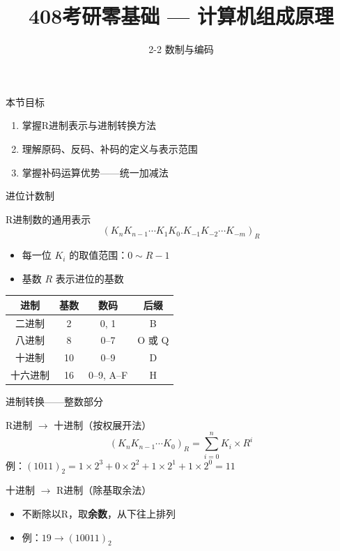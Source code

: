 \documentclass[10pt, aspectratio=169]{beamer}
\title{408考研零基础 --- 计算机组成原理}
\subtitle{2-2 数制与编码}
\author{}
\date{}
\begin{document}
\begin{frame}{本节目标}
    \begin{enumerate}
        \item 掌握R进制表示与进制转换方法
        \item 理解原码、反码、补码的定义与表示范围
        \item 掌握补码运算优势——统一加减法
    \end{enumerate}
\end{frame}

\begin{frame}{进位计数制}
    \begin{block}{R进制数的通用表示}
        \[
            (K_n K_{n-1} \cdots K_1 K_0 . K_{-1} K_{-2} \cdots K_{-m})_R
        \]
        \begin{itemize}
            \item 每一位 $K_i$ 的取值范围：$0 \sim R-1$
            \item 基数 $R$ 表示进位的基数
        \end{itemize}
    \end{block}
    \vspace{0.3em}
    \begin{tabular}{|c|c|c|c|}
        \hline
        \textbf{进制} & \textbf{基数} & \textbf{数码} & \textbf{后缀} \\
        \hline
        二进制 & 2 & 0, 1 & B \\
        \hline
        八进制 & 8 & 0--7 & O 或 Q \\
        \hline
        十进制 & 10 & 0--9 & D \\
        \hline
        十六进制 & 16 & 0--9, A--F & H \\
        \hline
    \end{tabular}
\end{frame}

\begin{frame}{进制转换——整数部分}
    \begin{block}{R进制 $\to$ 十进制（按权展开法）}
        \[
            (K_n K_{n-1} \cdots K_0)_R = \sum_{i=0}^{n} K_i \times R^i
        \]
        例：$(1011)_2 = 1 \times 2^3 + 0 \times 2^2 + 1 \times 2^1 + 1 \times 2^0 = 11$
    \end{block}
    \begin{block}{十进制 $\to$ R进制（除基取余法）}
        \begin{itemize}
            \item 不断除以R，取\textbf{余数}，从下往上排列
            \item 例：$19 \to (10011)_2$
        \end{itemize}
    \end{block}
\end{frame}
\end{document}
